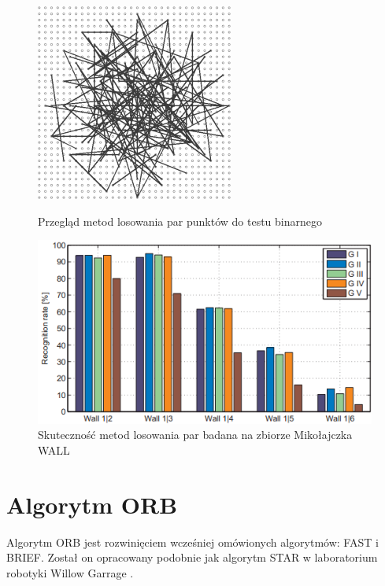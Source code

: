 \begin{figure}
{\includegraphics{pict/02/brief/G4.png}
}
\caption{Przegląd metod losowania par punktów do testu binarnego}
\label{fig:brief_dist}
\end{figure}

\begin{figure}
\centering
\includegraphics[scale=1]{pict/02/brief/G_comp.png}
\caption{Skuteczność metod losowania par badana na zbiorze Mikołajczka WALL}
\label{fig:brief_G_comp}
\end{figure}

\FloatBarrier
\newpage
\section{Algorytm ORB}
Algorytm ORB jest rozwinięciem wcześniej omówionych algorytmów: FAST i BRIEF. Został on opracowany podobnie jak algorytm STAR w laboratorium robotyki Willow Garrage \cite{ORB11}. 

